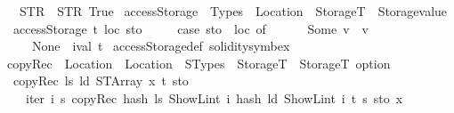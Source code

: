 \begin{isabellebody}
\ \ \ {\isacharparenleft}{\kern0pt}STR\ {\isacharprime}{\kern0pt}{\isacharprime}{\kern0pt}{}{\isachardot}{\kern0pt}{}{\isachardot}{\kern0pt}{}{\isacharprime}{\kern0pt}{\isacharprime}{\kern0pt}{\isacharcomma}{\kern0pt}\ STR\ {\isacharprime}{\kern0pt}{\isacharprime}{\kern0pt}True{\isacharprime}{\kern0pt}{\isacharprime}{\kern0pt}{\isacharparenright}{\kern0pt}{\isacharbrackright}{\kern0pt}{\isacharparenright}{\kern0pt}{\isachardoublequoteclose}%
\isadelimdocument
%
\endisadelimdocument
%
\isatagdocument
%
\isamarkuptrue%
%
\endisatagdocument
{\isafolddocument}%
%
\isadelimdocument
%
\endisadelimdocument
{}\isamarkupfalse%
\ accessStorage\ {\isacharcolon}{\kern0pt}{\isacharcolon}{\kern0pt}\ {\isachardoublequoteopen}Types\ {\isasymRightarrow}\ Location\ {\isasymRightarrow}\ StorageT\ {\isasymRightarrow}\ Storagevalue{\isachardoublequoteclose}\isanewline
{}\isanewline
\ \ {\isachardoublequoteopen}accessStorage\ t\ loc\ sto\ {\isacharequal}{\kern0pt}\isanewline
\ \ \ \ {\isacharparenleft}{\kern0pt}case\ sto\ {\isachardollar}{\kern0pt}{\isachardollar}{\kern0pt}\ loc\ of\isanewline
\ \ \ \ \ \ Some\ v\ {\isasymRightarrow}\ v\isanewline
\ \ \ \ {\isacharbar}{\kern0pt}\ None\ {\isasymRightarrow}\ ival\ t{\isacharparenright}{\kern0pt}{\isachardoublequoteclose}\isanewline
\isanewline
{}\isamarkupfalse%
\ accessStorage{\isacharunderscore}{\kern0pt}def\ {\isacharbrackleft}{\kern0pt}solidity{\isacharunderscore}{\kern0pt}symbex{\isacharbrackright}{\kern0pt}%
\isadelimdocument
%
\endisadelimdocument
%
\isatagdocument
%
\isamarkuptrue%
%
\endisatagdocument
{\isafolddocument}%
%
\isadelimdocument
%
\endisadelimdocument
{}\isamarkupfalse%
\ copyRec\ {\isacharcolon}{\kern0pt}{\isacharcolon}{\kern0pt}\ {\isachardoublequoteopen}Location\ {\isasymRightarrow}\ Location\ {\isasymRightarrow}\ STypes\ {\isasymRightarrow}\ StorageT\ {\isasymRightarrow}\ StorageT\ option{\isachardoublequoteclose}\isanewline
{}\isanewline
\ \ {\isachardoublequoteopen}copyRec\ l\isactrlsub s\ l\isactrlsub d\ {\isacharparenleft}{\kern0pt}STArray\ x\ t{\isacharparenright}{\kern0pt}\ sto\ {\isacharequal}{\kern0pt}\isanewline
\ \ \ \ iter{\isacharprime}{\kern0pt}\ {\isacharparenleft}{\kern0pt}{\isasymlambda}i\ s{\isacharprime}{\kern0pt}{\isachardot}{\kern0pt}\ copyRec\ {\isacharparenleft}{\kern0pt}hash\ l\isactrlsub s\ {\isacharparenleft}{\kern0pt}ShowL\isactrlsub i\isactrlsub n\isactrlsub t\ i{\isacharparenright}{\kern0pt}{\isacharparenright}{\kern0pt}\ {\isacharparenleft}{\kern0pt}hash\ l\isactrlsub d\ {\isacharparenleft}{\kern0pt}ShowL\isactrlsub i\isactrlsub n\isactrlsub t\ i{\isacharparenright}{\kern0pt}{\isacharparenright}{\kern0pt}\ t\ s{\isacharprime}{\kern0pt}{\isacharparenright}{\kern0pt}\ sto\ x{\isachardoublequoteclose}\isanewline

\end{isabellebody}
